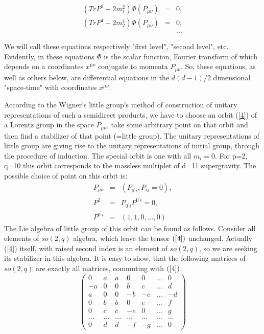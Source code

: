 \documentclass[a4paper,12pt]{article}
\begin{document}
\begin{eqnarray}
(TrP^{2}-2m_{1}^{2})\Phi (P_{\mu \nu }) &=&0,  \label{4} \\
(TrP^{4}-2m_{2}^{4})\Phi (P_{\mu \nu }) &=&0,  \nonumber \\
&&...  \nonumber
\end{eqnarray}

    We will call these equations respectively "first level",
"second level", etc.
    Evidently, in these equations $\Phi$ is the scalar function,
Fourier transform of which depends on a coordinates $x^{\mu \nu}$
conjugate to momenta $P_{\mu \nu}$. So, these equations, as well
as others below, are differential equations in the $d(d-1)/2$
dimensional "space-time" with coordinates $x^{\mu\nu}$.

According to the Wigner's  little group's method of construction
of unitary representations of such a semidirect products, we have
to choose an orbit (\ref{4}) of a Lorentz group in the space
$P_{\mu \nu}$, take some arbitrary point on that orbit and then
find a stabilizer of that point (=little group). The unitary
representations of little group are giving rise to the unitary
representations of initial group, through the procedure of
induction. The special orbit is one with all $m_{i}=0$. For p=2,
q=10 this orbit corresponds to the massless multiplet of d=11
supergravity. The possible choice of point on this orbit is:
\begin{eqnarray}
P_{\mu \nu } &=&(P_{0^{\prime }i},P_{ij}=0),  \label{41} \\
P^{2} &=&P_{0^{\prime }i}P^{0^{\prime }i}=0,  \label{5} \\
P^{0^{\prime }i} &=&(1,1,0,...,0)  \label{6}
\end{eqnarray}
    The Lie algebra of little group of this orbit can be found as
follows. Consider all elements of $so(2,q)$ algebra, which leave
the tensor $(\ref{4})$ unchanged. Actually (\ref{4}) itself, with
raised second index is an element of $so(2,q)$, so we are seeking
its stabilizer in this algebra. It is easy to show, that the
following matrices of $so(2,q)$ are exactly all matrices,
commuting with $(\ref{4})$:
\begin{equation}
\left(
\begin{array}{ccccccc}
0 & a & a & 0 & 0 & ... & 0 \\
-a & 0 & 0 & b & c & ... & d \\
a & 0 & 0 & -b & -c & ... & -d \\
0 & b & b & 0 & e & ... & f \\
0 & c & c & -e & 0 & ... & g \\
... & ... & ... & ... & ... & ... & ... \\
0 & d & d & -f & -g & ... & 0
\end{array}
\right)  \label{m1}
\end{equation}
\end{document}
